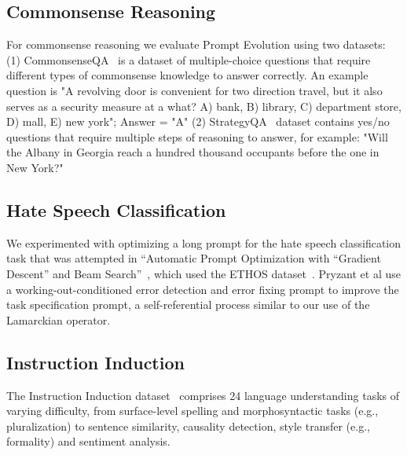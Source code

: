 \documentclass{article} %
\begin{document}
\subsection{Commonsense Reasoning}

For commonsense reasoning we evaluate Prompt Evolution using two datasets:
(1) CommonsenseQA~\citep{talmor-etal-2019-commonsenseqa} is a dataset of multiple-choice questions that require different types of commonsense knowledge to answer correctly. An example question is "A revolving door is convenient for two direction travel, but it also serves as a security measure at a what? A) bank, B) library, C) department store, D) mall, E) new york"; Answer = "A" (2) StrategyQA~\citep{DBLP:journals/tacl/GevaKSKRB21} dataset contains yes/no questions that require multiple steps of reasoning to answer, for example: "Will the Albany in Georgia reach a hundred thousand occupants before the one in New York?"


\subsection{Hate Speech Classification} 

We experimented with optimizing a long prompt for the hate speech classification task that was attempted in ``Automatic Prompt Optimization with “Gradient Descent” and Beam Search''~\citep{pryzant2023automatic}, which used the ETHOS dataset~\citep{Mollas_2022}. Pryzant et al use a working-out-conditioned error detection and error fixing prompt to improve the task specification prompt, a self-referential process similar to our use of the Lamarckian operator. 

\subsection{Instruction Induction} 

The Instruction Induction dataset~\citep{DBLP:conf/acl/Honovich0BL23} comprises 24 language understanding tasks of varying difficulty, from surface-level spelling and morphosyntactic tasks (e.g., pluralization) to sentence similarity, causality detection, style transfer (e.g., formality) and sentiment analysis.
\end{document}

